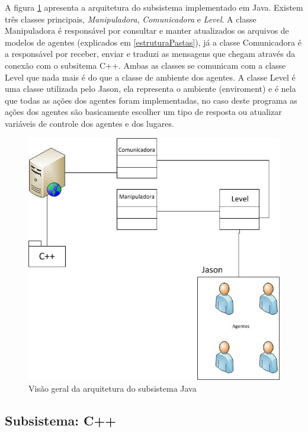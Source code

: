 A figura \ref{arquiteturaJava} apresenta a arquitetura do subsistema implementado em Java. Existem três classes principais, \emph{Manipuladora}, \emph{Comunicadora} e \emph{Level}.
A classe Manipuladora é responsável por consultar e manter atualizados os arquivos de modelos de agentes (explicados em \ref{estruturaPastas}), já a classe Comunicadora é a responsável por receber, enviar e traduzi as mensagens que chegam através da conexão com o subsitema C++. Ambas as classes se comunicam com a classe Level que nada mais é do que a classe de ambiente dos agentes. A classe Level é uma classe utilizada pelo Jason, ela representa o ambiente (enviroment) e é nela que todas as ações dos agentes foram implementadas, no caso deste programa as ações dos agentes são basicamente escolher um tipo de resposta ou atualizar variáveis de controle dos agentes e dos lugares.

\begin{figure}
\centering
\includegraphics {figuras/arquitetura-java.jpg}
\caption{Visão geral da arquitetura do subsistema Java}
\label{arquiteturaJava}
\end{figure}



\subsection{Subsistema: C++}



